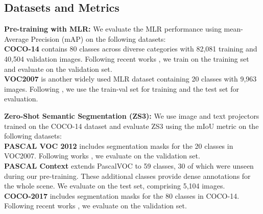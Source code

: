 
\subsection{Datasets and Metrics}

\textbf{Pre-training with MLR:} We evaluate the MLR performance using mean-Average Precision (mAP) on the following datasets:\\
\textbf{COCO-14} \cite{coco} contains 80 classes across diverse categories with 82,081 training and 40,504 validation images. Following recent works \cite{dualcoop,MLR-GCN,PositiveCoOp}, we train on the training set and evaluate on the validation set. \\
% 
\textbf{VOC2007} \cite{pascal-voc} is another widely used MLR dataset containing 20 classes with 9,963 images. Following \cite{dualcoop,MLR-GCN,PositiveCoOp}, we use the train-val set for training and the test set for evaluation. 



\textbf{Zero-Shot Semantic Segmentation (ZS3):} We use image and text projectors trained on the COCO-14 dataset and evaluate ZS3 using the mIoU metric on the following datasets: \\
\textbf{PASCAL VOC 2012} \cite{pascal-voc} includes segmentation masks for the 20 classes in VOC2007.  Following works \cite{clip_surgery,gem_walid}, we evaluate on the validation set.\\
% 
\textbf{PASCAL Context} \cite{context} extends PascalVOC to 59 classes, 30 of which were unseen during our pre-training. These additional classes provide dense annotations for the whole scene. We evaluate on the test set, comprising 5,104 images.\\
% 
\textbf{COCO-2017} \cite{coco} includes segmentation masks for the 80 classes in COCO-14.  Following recent works \cite{clip_surgery,gem_walid}, we evaluate on the validation set.
% 
% 
% 
